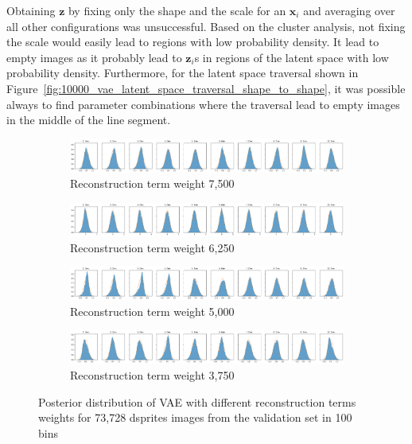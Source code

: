 Obtaining $\bm{z}$ by fixing only the shape and the scale for an $\bm{x}_i$ and averaging over all other configurations was unsuccessful.
Based on the cluster analysis, not fixing the scale would easily lead to regions with low probability density.
It lead to empty images as it probably lead to $\bm{z}_i$s in regions of the latent space with low probability density.
Furthermore, for the latent space traversal shown in Figure~\ref{fig:10000_vae_latent_space_traversal_shape_to_shape}, it was possible always to find parameter combinations where the traversal lead to empty images in the middle of the line segment.

\begin{figure}
    \centering
    \begin{subfigure}{\textwidth}
        \centering
        \includegraphics[width=\textwidth]{images/latent_space_entanglement/vae_dsprites_lf_7500_dist.png}
        \caption{Reconstruction term weight 7,500}
    \end{subfigure}
    \begin{subfigure}{\textwidth}
        \centering
        \includegraphics[width=\textwidth]{images/latent_space_entanglement/vae_dsprites_lf_6250_dist.png}
        \caption{Reconstruction term weight 6,250}
    \end{subfigure}
    \begin{subfigure}{\textwidth}
        \centering
        \includegraphics[width=\textwidth]{images/latent_space_entanglement/vae_dsprites_lf_5000_dist.png}
        \caption{Reconstruction term weight 5,000}
    \end{subfigure}
    \begin{subfigure}{\textwidth}
        \centering
        \includegraphics[width=\textwidth]{images/latent_space_entanglement/vae_dsprites_lf_3750_dist.png}
        \caption{Reconstruction term weight 3,750}
    \end{subfigure}
    \caption[VAE Latent Space Distribution - Different Reconstruction Term Weights]{Posterior distribution of VAE with different reconstruction terms weights for 73,728 dsprites images from the validation set in 100 bins}
    \label{fig:7500_5000_vae_latent_space_distribution_scales_and_shapes}
\end{figure}

